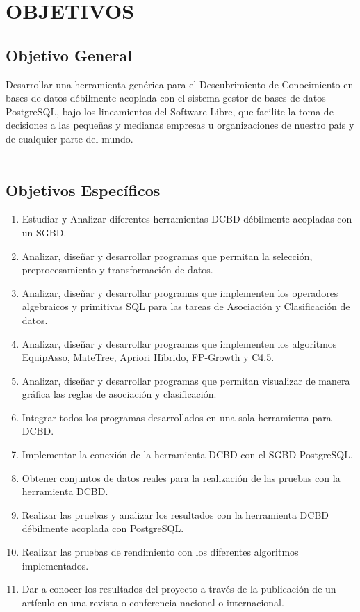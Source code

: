 \chapter{OBJETIVOS}
\section{Objetivo General}
Desarrollar una herramienta gen\'erica para el  Descubrimiento de Conoci\-miento en bases de datos  d\'ebilmente acoplada con el  sistema gestor de bases de datos PostgreSQL, bajo los lineamientos del Software Libre, que facilite la toma de decisiones a las peque\~nas y medianas empresas u organizaciones de nuestro pa\'is y de cualquier parte del mundo.\\
\\
\section{Objetivos Espec\'ificos}
\begin{enumerate}
\item Estudiar  y Analizar  diferentes herramientas  DCBD d\'ebilmente acopladas con un SGBD.
\item Analizar, dise\~nar y desarrollar programas que permitan la selecci\'on, preprocesamiento y transformaci\'on de datos.
\item Analizar, dise\~nar y desarrollar programas que implementen los opera\-dores algebraicos y primitivas SQL para las tareas de Asociaci\'on y Clasificaci\'on de datos.
\item Analizar, dise\~nar y desarrollar programas que implementen los algoritmos EquipAsso, MateTree, Apriori H\'ibrido, FP-Growth y C4.5.
\item Analizar, dise\~nar y desarrollar programas que permitan visualizar de manera gr\'afica las reglas de asociaci\'on y clasificaci\'on.
\item Integrar todos los programas desarrollados en una sola herramienta para DCBD.
\item Implementar la conexi\'on de la herramienta DCBD con el SGBD PostgreSQL.
\item Obtener conjuntos de datos reales para la realizaci\'on de las pruebas con la herramienta DCBD.
\item Realizar las pruebas y analizar los resultados con la herramienta DCBD d\'ebilmente acoplada con PostgreSQL.
\item Realizar las pruebas de rendimiento con los diferentes algoritmos implementados.
\item Dar a conocer los resultados del proyecto a trav\'es de la publicaci\'on de un art\'iculo en una revista o conferencia nacional o internacional.
\end{enumerate}
